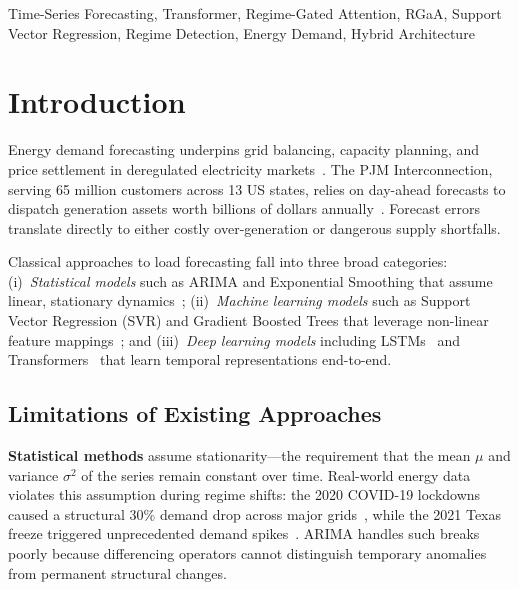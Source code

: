 \documentclass[conference, 10pt]{IEEEtran}
\begin{document}
\begin{IEEEkeywords}
Time-Series Forecasting, Transformer, Regime-Gated Attention, RGaA, Support Vector Regression, Regime Detection, Energy Demand, Hybrid Architecture
\end{IEEEkeywords}

\section{Introduction}

Energy demand forecasting underpins grid balancing, capacity planning, and price settlement in deregulated electricity markets~\cite{hong2016probabilistic}. The PJM Interconnection, serving 65 million customers across 13 US states, relies on day-ahead forecasts to dispatch generation assets worth billions of dollars annually~\cite{pjm2020}. Forecast errors translate directly to either costly over-generation or dangerous supply shortfalls.

Classical approaches to load forecasting fall into three broad categories: (i)~\textit{Statistical models} such as ARIMA and Exponential Smoothing that assume linear, stationary dynamics~\cite{box2015time}; (ii)~\textit{Machine learning models} such as Support Vector Regression (SVR) and Gradient Boosted Trees that leverage non-linear feature mappings~\cite{vapnik1995support}; and (iii)~\textit{Deep learning models} including LSTMs~\cite{hochreiter1997lstm} and Transformers~\cite{vaswani2017attention} that learn temporal representations end-to-end.

\subsection{Limitations of Existing Approaches}

\textbf{Statistical methods} assume stationarity---the requirement that the mean $\mu$ and variance $\sigma^2$ of the series remain constant over time. Real-world energy data violates this assumption during regime shifts: the 2020 COVID-19 lockdowns caused a structural 30\% demand drop across major grids~\cite{eia2020covid}, while the 2021 Texas freeze triggered unprecedented demand spikes~\cite{busby2021cascading}. ARIMA handles such breaks poorly because differencing operators cannot distinguish temporary anomalies from permanent structural changes.
\end{document}
